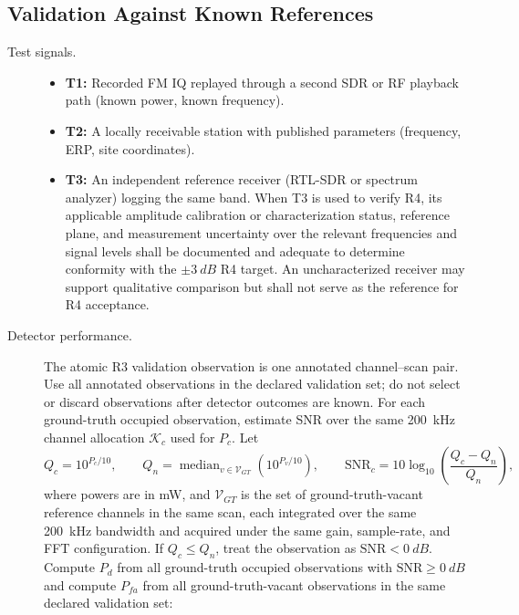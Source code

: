 \documentclass[12pt,a4paper]{report}
\begin{document}
 \subsection*{Validation Against Known References}
 \begin{description}
 	\item[Test signals.] 
 	\begin{itemize}
 		\item \textbf{T1:} Recorded FM IQ replayed through a second SDR or RF
 		playback path (known power, known frequency).
 		\item \textbf{T2:} A locally receivable station with published parameters
 		(frequency, ERP, site coordinates).
 		\item \textbf{T3:} An independent reference receiver (RTL-SDR or spectrum
 		analyzer) logging the same band. When T3 is used to verify R4, its applicable
 		amplitude calibration or characterization status, reference plane, and
 		measurement uncertainty over the relevant frequencies and signal levels shall
 		be documented and adequate to determine conformity with the
 		$\pm\SI{3}{dB}$ R4 target. An uncharacterized receiver may support qualitative
 		comparison but shall not serve as the reference for R4 acceptance.
 	\end{itemize}
 	\item[Detector performance.] The atomic R3 validation observation is one annotated channel--scan pair. Use all annotated observations in the declared validation set; do not select or discard observations after detector outcomes are known. For each ground-truth occupied observation, estimate SNR over the same \SI{200}{kHz} channel allocation $\mathcal{K}_c$ used for $P_c$. Let
 	\begin{equation}
 		Q_c = 10^{P_c/10}, \qquad
 		Q_n = \operatorname{median}_{v \in \mathcal{V}_{GT}}\!\left(10^{P_v/10}\right),
 		\qquad
 		\text{SNR}_c = 10\log_{10}\!\left(\frac{Q_c-Q_n}{Q_n}\right),
 	\end{equation}
 	where powers are in mW, and $\mathcal{V}_{GT}$ is the set of ground-truth-vacant reference channels in the same scan, each integrated over the same \SI{200}{kHz} bandwidth and acquired under the same gain, sample-rate, and FFT configuration. If $Q_c \le Q_n$, treat the observation as $\text{SNR}<\SI{0}{dB}$. Compute $P_d$ from all ground-truth occupied observations with $\text{SNR}\ge\SI{0}{dB}$ and compute $P_{fa}$ from all ground-truth-vacant observations in the same declared validation set:
 	\begin{equation}

\end{equation}
\end{description}
\end{document}
